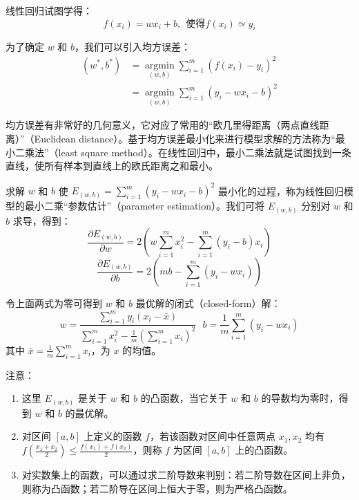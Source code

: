 \documentclass[12pt, a4paper]{article} %
\begin{document}
线性回归试图学得：
\begin{equation*}
    f(x_i) = wx_i + b, \ \ \text{使得} f(x_i) \simeq y_i
\end{equation*}

为了确定 $w$ 和 $b$，我们可以引入均方误差：
\begin{equation*}
    \begin{array}{*{20}{l}}
        {({w^*},{b^*})}&{ = \mathop {\arg \min }\limits_{(w,b)} \sum\limits_{i = 1}^m {{{(f({x_i}) - {y_i})}^2}} }\\
        {}&{ = \mathop {\arg \min }\limits_{(w,b)} \sum\limits_{i = 1}^m {{{({y_i} - w{x_i} - b)}^2}} }
    \end{array}
\end{equation*}

均方误差有非常好的几何意义，它对应了常用的“欧几里得距离（两点直线距离）”（Euclidean distance）。基于均方误差最小化来进行模型求解的方法称为“最小二乘法”（least square method）。在线性回归中，最小二乘法就是试图找到一条直线，使所有样本到直线上的欧氏距离之和最小。

求解 $w$ 和 $b$ 使 $\displaystyle E_{(w, b)} = \sum_{i = 1}^{m} (y_i - wx_i -b)^2$ 最小化的过程，称为线性回归模型的最小二乘“参数估计”（parameter estimation）。我们可将 $E_{(w, b)}$ 分别对 $w$ 和 $b$ 求导，得到：
\begin{equation*}
    \frac{{\partial {E_{(w,b)}}}}{{\partial w}} = 2\left( {w\sum\limits_{i = 1}^m {x_i^2}  - \sum\limits_{i = 1}^m {({y_i} - b){x_i}} } \right)
\end{equation*}
\begin{equation*}
    \frac{{\partial {E_{(w,b)}}}}{{\partial b}} = 2\left( {mb - \sum\limits_{i = 1}^m {({y_i} - w{x_i})} } \right)
\end{equation*}

令上面两式为零可得到 $w$ 和 $b$ 最优解的闭式（closed-form）解：
\begin{equation*}
    w = \frac{{\sum\limits_{i = 1}^m {{y_i}\left( {{x_i} - \bar x} \right)} }}{{\sum\limits_{i = 1}^m {x_i^2}  - \frac{1}{m}{{\left( {\sum\limits_{i = 1}^m {{x_i}} } \right)}^2}}} \ \ \ b = \frac{1}{m}\sum\limits_{i = 1}^m {({y_i} - w{x_i})}
\end{equation*}
其中 $\displaystyle \bar{x} = \frac{1}{m} \sum_{i = 1}^{m} x_i$，为 $x$ 的均值。

注意：
\begin{enumerate}[\hspace*{2em} i.]
    \item 这里 $E_{(w, b)}$ 是关于 $w$ 和 $b$ 的凸函数，当它关于 $w$ 和 $b$ 的导数均为零时，得到 $w$ 和 $b$ 的最优解。
    \item 对区间 $[a, b]$ 上定义的函数 $f$，若该函数对区间中任意两点 $x_1, x_2$ 均有 $\displaystyle f(\frac{x_1 + x_2}{2}) \le \frac{f(x_1) + f(x_2)}{2}$，则称 $f$ 为区间 $[a, b]$ 上的凸函数。
    \item 对实数集上的函数，可以通过求二阶导数来判别：若二阶导数在区间上非负，则称为凸函数；若二阶导在区间上恒大于零，则为严格凸函数。
\end{enumerate}
\end{document}
